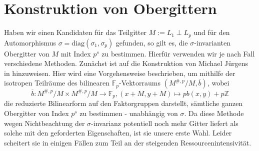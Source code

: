 \documentclass[12pt,a4paper,halfparskip,headsepline,bibtotocnumbered]{scrreprt}
\theoremstyle{nummermitklammern}
\theoremstyle{nonumberbreak}
\newcommand{\Z}{\mathbb{Z}}
\newcommand{\F}{\mathbb{F}}
\begin{document}
\section{Konstruktion von Obergittern}

Haben wir einen Kandidaten für das Teilgitter $M := L_1 \perp L_p$ und für den Automorphismus $\sigma = \text{diag}(\sigma_1, \sigma_p)$ gefunden, so gilt es, die $\sigma$-invarianten Obergitter von $M$ mit Index $p^s$ zu bestimmen. Hierfür verwenden wir je nach Fall verschiedene Methoden. Zunächst ist auf die Konstruktion von Michael Jürgens in \cite[Abschnitt (1.4)]{juergens} hinzuweisen. Hier wird eine Vorgehensweise beschrieben, um mithilfe der isotropen Teilräume des bilinearen $\F_p$-Vektorraums $(M^{\#,p} / M, \overline{b})$, wobei
\begin{equation*}
	\overline{b} : M^{\#,p} / M \times M^{\#,p} / M \rightarrow \F_p, (x+M,y+M) \mapsto pb(x,y) + p\Z
\end{equation*}
die reduzierte Bilinearform auf den Faktorgruppen darstellt, sämtliche ganzen Obergitter von Index $p^s$ zu bestimmen - unabhängig von $\sigma$. Da diese Methode wegen Nichtbeachtung der $\sigma$-invarianz potentiell noch mehr Gitter liefert als solche mit den geforderten Eigenschaften, ist sie unsere erste Wahl. Leider scheitert sie in einigen Fällen zum Teil an der steigenden Ressourcenintensivität.\par
\end{document}
